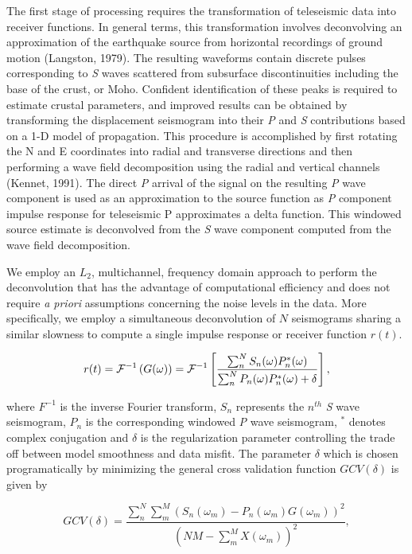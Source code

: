 \documentclass[review]{elsarticle}
\begin{document}
The first stage of processing requires the transformation of teleseismic data into receiver functions. In general terms, this transformation involves deconvolving an approximation of the earthquake source from horizontal recordings of ground motion (Langston, 1979). The resulting waveforms contain discrete pulses corresponding to {\it S} waves scattered from subsurface discontinuities including the base of the crust, or Moho. Confident identification of these peaks is required to estimate crustal parameters, and improved results can be obtained by transforming the displacement seismogram into their {\it P} and {\it S} contributions based on a 1-D model of propagation. This procedure is accomplished by first rotating the N and E coordinates into radial and transverse directions and then performing a wave field decomposition using the radial and vertical channels (Kennet, 1991). The direct {\it P} arrival of the signal on the resulting {\it P} wave component is used as an approximation to the source function as {\it P} component impulse response for teleseismic P approximates a delta function. This windowed source estimate is deconvolved from the {\it S} wave component computed from the wave field decomposition.

We employ an $L_2$, multichannel, frequency domain approach to perform the deconvolution that has the advantage of computational efficiency and does not require {\it a priori} assumptions concerning the noise levels in the data. More specifically, we employ a simultaneous deconvolution of $N$ seismograms sharing a similar slowness to compute a single impulse response or receiver function $r(t)$.

\begin{equation}
  r(t) = {\cal F}^{-1} \left( G(\omega) \right) = {\cal F}^{-1}
 \left[ \frac {\sum_n^N S_n(\omega)P_n^*(\omega)} {\sum_n^N P_n(\omega)P_n^*(\omega) + \delta} \right ],
\end{equation}

\noindent where $F^{-1}$ is the inverse Fourier transform, $S_n$ represents the $n^{th}$ {\it S} wave seismogram, $P_n$ is the corresponding windowed {\it P} wave seismogram, $^*$ denotes complex conjugation and $\delta$ is the regularization parameter controlling the trade off between model smoothness and data misfit. The parameter $\delta$ which is chosen programatically by minimizing the general cross validation function $GCV(\delta)$ is given by

\begin{equation}
  GCV(\delta) = \frac {\sum_n^N\sum_m^M \left( S_n(\omega_m) - P_n(\omega_m)G(\omega_m) \right)^2 }
                      { \left( NM - \sum_m^M X(\omega_m) \right)^2 },
\end{equation}
\end{document}
